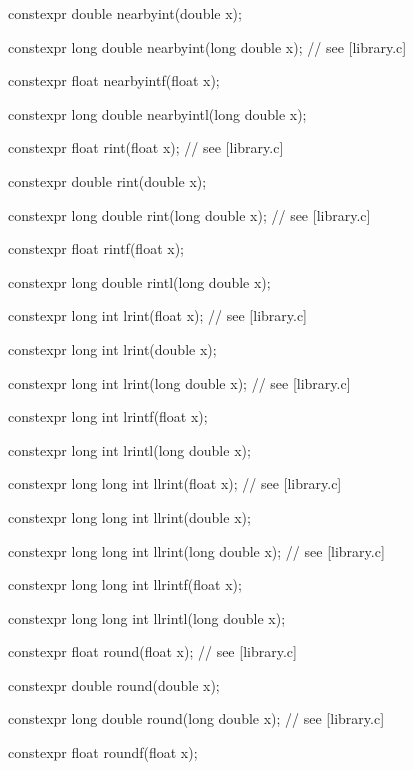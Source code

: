 \documentclass[prd,twocolumn,amsmath,amssymb,nofootinbib,eqsecnum]{revtex4-1}
\newcommand{\highlight}[1]{{\color{red} #1}}
\begin{document}
\begin{widetext}
{\highlight{constexpr} double nearbyint(double x);

\highlight{constexpr} long double nearbyint(long double x); // see [library.c]

\highlight{constexpr} float nearbyintf(float x);

\highlight{constexpr} long double nearbyintl(long double x);

\vspace{2ex}

\highlight{constexpr} float rint(float x); // see [library.c]

\highlight{constexpr} double rint(double x);

\highlight{constexpr} long double rint(long double x); // see [library.c]

\highlight{constexpr} float rintf(float x);

\highlight{constexpr} long double rintl(long double x);

\vspace{2ex}

\highlight{constexpr} long int lrint(float x); // see [library.c]

\highlight{constexpr} long int lrint(double x);

\highlight{constexpr} long int lrint(long double x); // see [library.c]

\highlight{constexpr} long int lrintf(float x);

\highlight{constexpr} long int lrintl(long double x);

\vspace{2ex}

\highlight{constexpr} long long int llrint(float x); // see [library.c]

\highlight{constexpr} long long int llrint(double x);

\highlight{constexpr} long long int llrint(long double x); // see [library.c]

\highlight{constexpr} long long int llrintf(float x);

\highlight{constexpr} long long int llrintl(long double x);

\vspace{2ex}

\highlight{constexpr} float round(float x); // see [library.c]

\highlight{constexpr} double round(double x);

\highlight{constexpr} long double round(long double x); // see [library.c]

\highlight{constexpr} float roundf(float x);

}
\end{widetext}
\end{document}
